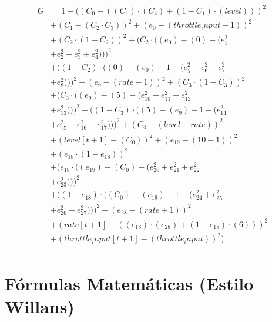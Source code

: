 \documentclass[10pt, a4paper]{article}
\begin{document}
\begin{small}
\begin{align*}
G &= 1 - ((C_{0} - ((C_{1})  \cdot  (C_{4}) + (1 - C_{1})  \cdot  (level)))^{2} \\
& + (C_{1} - (C_{2}  \cdot  C_{3}))^{2} + (e_{0} - (throttle_input - 1))^{2} \\
& + (C_{2}  \cdot  (1 - C_{2}))^{2} + (C_{2}  \cdot  ((e_{0}) - (0) - (e_{1}^{2} \\
& + e_{2}^{2} + e_{3}^{2} + e_{4}^{2})))^{2} \\
& + ((1 - C_{2})  \cdot  ((0) - (e_{0}) - 1 - (e_{5}^{2} + e_{6}^{2} + e_{7}^{2} \\
& + e_{8}^{2})))^{2} + (e_{9} - (rate - 1))^{2} + (C_{3}  \cdot  (1 - C_{3}))^{2} \\
& + (C_{3}  \cdot  ((e_{9}) - (5) - (e_{10}^{2} + e_{11}^{2} + e_{12}^{2} \\
& + e_{13}^{2})))^{2} + ((1 - C_{3})  \cdot  ((5) - (e_{9}) - 1 - (e_{14}^{2} \\
& + e_{15}^{2} + e_{16}^{2} + e_{17}^{2})))^{2} + (C_{4} - (level - rate))^{2} \\
& + (level[t+1] - (C_{0}))^{2} + (e_{19} - (10 - 1))^{2} \\
& + (e_{18}  \cdot  (1 - e_{18}))^{2} \\
& + (e_{18}  \cdot  ((e_{19}) - (C_{0}) - (e_{20}^{2} + e_{21}^{2} + e_{22}^{2} \\
& + e_{23}^{2})))^{2} \\
& + ((1 - e_{18})  \cdot  ((C_{0}) - (e_{19}) - 1 - (e_{24}^{2} + e_{25}^{2} \\
& + e_{26}^{2} + e_{27}^{2})))^{2} + (e_{28} - (rate + 1))^{2} \\
& + (rate[t+1] - ((e_{18})  \cdot  (e_{28}) + (1 - e_{18})  \cdot  (6)))^{2} \\
& + (throttle_input[t+1] - (throttle_input))^{2}) \\
\end{align*}
\end{small}\part{Fórmulas Matemáticas (Estilo Willans)}
\end{document}
